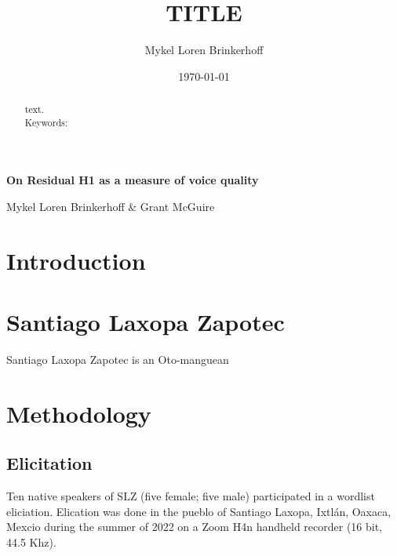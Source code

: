 \documentclass[12pt, letterpaper]{article}
\title{TITLE}
\author{Mykel Loren Brinkerhoff}
\date{\today}
\begin{document}

	\onehalfspacing

\begin{center}
     {\Large \textbf{On Residual H1 as a measure of voice quality}}
     \vspace{6pt}

     Mykel Loren Brinkerhoff \& Grant McGuire
\end{center}
\thispagestyle{fancy}


\begin{abstract}
    text.
    \\
    Keywords:
\end{abstract}

\section{Introduction} \label{sec:Introduction}


\section{Santiago Laxopa Zapotec} \label{sec:SLZ}

Santiago Laxopa Zapotec is an Oto-manguean   

\section{Methodology} \label{sec:Methods}

\subsection{Elicitation} \label{sec:Elicitation}
Ten native speakers of SLZ (five female; five male) participated in a wordlist eliciation. Elication was done in the pueblo of Santiago Laxopa, Ixtlán, Oaxaca, Mexcio during the summer of 2022 on a Zoom H4n handheld recorder (16 bit, 44.5 Khz). 
\end{document}

